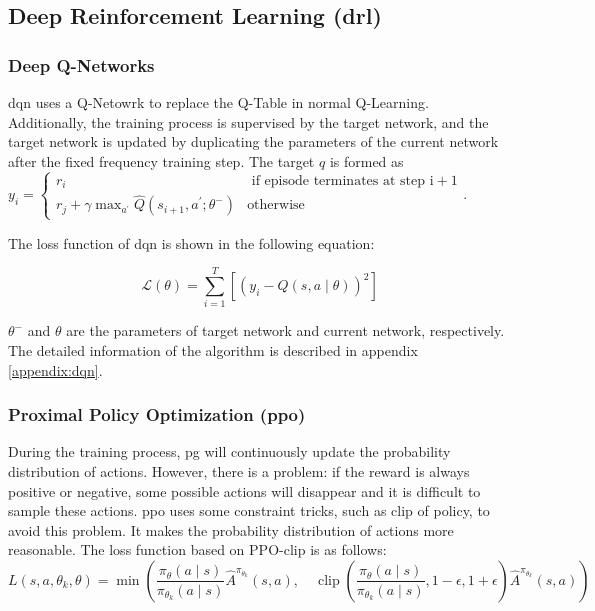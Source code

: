 \subsection{Deep Reinforcement Learning (\gls{drl})}
\subsubsection{Deep Q-Networks}
\gls{dqn} uses a Q-Netowrk to replace the Q-Table in normal Q-Learning. Additionally, the training process is supervised by the target network, and the target network is updated by duplicating the parameters of the current network after the fixed frequency training step. The target $q$ is formed as $y_{i}=\left\{\begin{array}{cc}r_{i} & \text { if episode terminates at step } \mathrm{i}+1 \\ r_{j}+\gamma \max _{a^{\prime}} \hat{Q}\left(s_{i+1}, a^{\prime} ; \theta^{-}\right) & \text {otherwise }\end{array}\right.$.

The loss function of \gls{dqn} is shown in the following equation:

\begin{equation}
\mathcal{L}(\theta)=\sum_{i=1}^{T}\left[\left(y_{i}-Q(s, a \mid \theta)\right)^{2}\right]
\end{equation}

$\theta^{-}$ and $\theta$ are the parameters of target network and current network, respectively. The detailed information of the algorithm is described in appendix \ref{appendix:dqn}.

\subsubsection{Proximal Policy Optimization (\gls{ppo})}
During the training process, \gls{pg} will continuously update the probability distribution of actions. However, there is a problem: if the reward is always positive or negative, some possible actions will disappear and it is difficult to sample these actions. \gls{ppo} uses some constraint tricks, such as clip of policy, to avoid this problem. It makes the probability distribution of actions more reasonable. The loss function based on PPO-clip is as follows:
\begin{equation}
L\left(s, a, \theta_{k}, \theta\right)=\min \left(\frac{\pi_{\theta}(a \mid s)}{\pi_{\theta_{k}}(a \mid s)} \hat{A}^{\pi_{\theta_{k}}}(s, a), \quad \operatorname{clip}\left(\frac{\pi_{\theta}(a \mid s)}{\pi_{\theta_{k}}(a \mid s)}, 1-\epsilon, 1+\epsilon\right) \hat{A}^{\pi_{\theta_{k}}}(s, a)\right)
\end{equation} 

